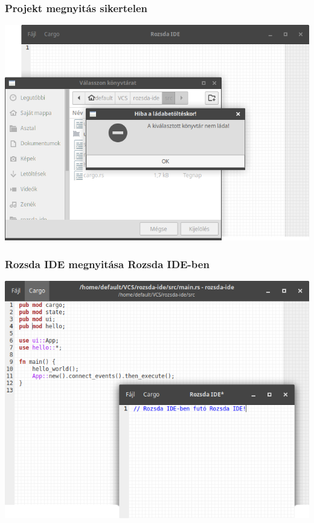 \documentclass{beamer}
\begin{document}
    \begin{frame}[fragile]
        \frametitle{Projekt megnyitás sikertelen}

        \begin{center}
            \includegraphics[scale=0.3]{kepek/projekt-megnyitas-sikertelen.png}
        \end{center}
    \end{frame}

    \begin{frame}[fragile]
        \frametitle{Rozsda IDE megnyitása Rozsda IDE-ben}

        \begin{center}
            \includegraphics[scale=0.3]{kepek/rozsda-ide-rozsda-ideben.png}
        \end{center}
    \end{frame}
\end{document}

